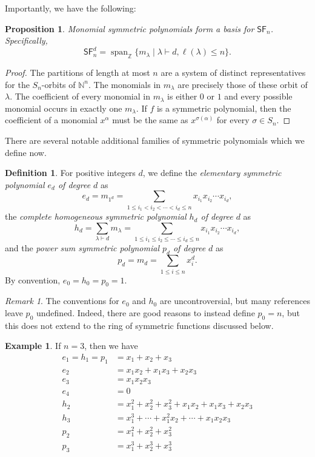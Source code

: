 \documentclass[12pt]{article}
\theoremstyle{plain}
\newtheorem{proposition}[theorem]{Proposition}
\theoremstyle{definition}
\newtheorem{definition}[theorem]{Definition}
\newtheorem{example}[theorem]{Example}
\theoremstyle{remark}
\newtheorem{remark}[theorem]{Remark}
\numberwithin{equation}{section}
\begin{document}
Importantly, we have the following:

\begin{proposition}
Monomial symmetric polynomials form a basis for $\mathsf{SF}_n$.
Specifically,
\[
\mathsf{SF}_n^d = \operatorname{span}_{\mathbb{Z}}
\{ m_\lambda \mid \lambda \vdash d, \ell(\lambda) \le n \}.
\]
\end{proposition}

\begin{proof}
The partitions of length at most $n$ are a system of distinct
representatives for the $S_n$-orbits of $\mathbb{N}^n$.
The monomials in $m_\lambda$ are precisely those of these orbit of
$\lambda$.
The coefficient of every monomial
in $m_\lambda$ is either $0$ or $1$ and every possible monomial
occurs in exactly one $m_\lambda$.
If $f$ is a symmetric polynomial, then the coefficient
of a monomial $x^\alpha$ must be the same as $x^{\sigma(\alpha)}$
for every $\sigma \in S_n$.  
\end{proof}

There are several notable additional families of symmetric polynomials
which we define now.

\begin{definition}
For positive integers $d$, we define
the \emph{elementary symmetric polynomial $e_d$ of degree $d$} as
\[
e_d = m_{1^d} = \sum_{1 \le i_1 < i_2 < \cdots < i_d \le n} x_{i_1}x_{i_2}\cdots
x_{i_d},
\]
the \emph{complete homogeneous symmetric polynomial $h_d$ of degree $d$} as
\[
h_d = \sum_{\lambda \vdash d} m_\lambda = \sum_{1 \le i_1 \le i_2 \le \cdots \le i_d \le n} x_{i_1}x_{i_2}\cdots
x_{i_d},
\]
and the \emph{power sum symmetric polynomial $p_d$ of degree $d$} as
\[
p_d = m_d = \sum_{1 \le i \le n} x_i^d.
\]
By convention, $e_0=h_0=p_0=1$.
\end{definition}

\begin{remark}
The conventions for $e_0$ and $h_0$ are uncontroversial,
but many references leave $p_0$ undefined.
Indeed, there are good reasons to instead define $p_0=n$, but this does not
extend to the ring of symmetric functions discussed below. 
\end{remark}

\begin{example}
If $n=3$, then we have
\begin{align*}
e_1 = h_1 = p_1 &= x_1 + x_2 + x_3\\
e_2 &= x_1x_2 + x_1x_3 + x_2x_3\\
e_3 &= x_1x_2x_3 \\
e_4 &= 0 \\
h_2 &= x_1^2 + x_2^2 + x_3^2 + x_1x_2 + x_1x_3 + x_2x_3\\
h_3 &= x_1^3 + \cdots + x_1^2x_2 + \cdots + x_1x_2x_3\\
p_2 &= x_1^2 + x_2^2 + x_3^2\\
p_3 &= x_1^3 + x_2^3 + x_3^3
\end{align*}
\end{example}
\end{document}
